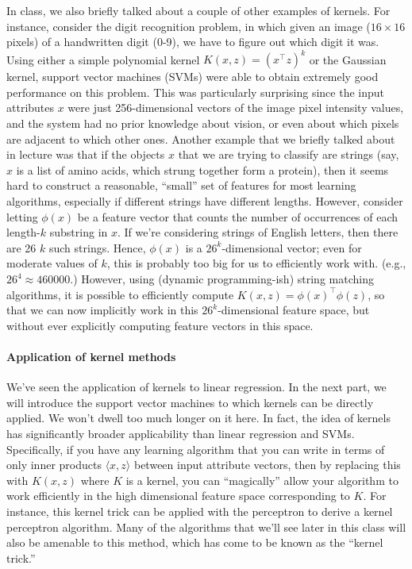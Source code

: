 In class, we also briefly talked about a couple of other examples of kernels.
For instance, consider the digit recognition problem, in which given
an image ($16\times16$ pixels) of a handwritten digit (0-9), we have to figure out
which digit it was. Using either a simple polynomial kernel $K(x,z) = (x^\top z)^k$
or the Gaussian kernel, support vector machines (SVMs) were able to obtain extremely good %
performance on this problem. This was particularly surprising since the input
attributes $x$ were just 256-dimensional vectors of the image pixel intensity
values, and the system had no prior knowledge about vision, or even about
which pixels are adjacent to which other ones. Another example that we
briefly talked about in lecture was that if the objects $x$ that we are trying
to classify are strings (say, $x$ is a list of amino acids, which strung together
form a protein), then it seems hard to construct a reasonable, ``small'' set of
features for most learning algorithms, especially if different strings have different
lengths. However, consider letting $\phi(x)$ be a feature vector that counts
the number of occurrences of each length-$k$ substring in $x$. If we're considering
strings of English letters, then there are 26 $k$ such strings. Hence, $\phi(x)$
is a $26^k$-dimensional vector; even for moderate values of $k$, this is probably %
too big for us to efficiently work with. (e.g., $26^4 \approx 460000$.) However, using
(dynamic programming-ish) string matching algorithms, it is possible to efficiently
compute $K(x,z) = \phi(x)^\top \phi(z)$, so that we can now implicitly work
in this $26^k$-dimensional feature space, but without ever explicitly computing
feature vectors in this space.

\paragraph{Application of kernel methods} We've seen the application of kernels %
to linear regression. In the next part, we will introduce the support vector
machines to which kernels can be directly applied. We won't dwell too much longer on %
it here. In fact, the idea of kernels has significantly broader applicability than
linear regression and SVMs. Specifically, if you have any learning algorithm
that you can write in terms of only inner products $\langle x,z \rangle$ between input
attribute vectors, then by replacing this with $K(x,z)$ where $K$ is a kernel,
you can ``magically'' allow your algorithm to work efficiently in the high
dimensional feature space corresponding to $K$. For instance, this kernel trick
can be applied with the perceptron to derive a kernel perceptron algorithm.
Many of the algorithms that we'll see later in this class will also be amenable
to this method, which has come to be known as the ``kernel trick.''
